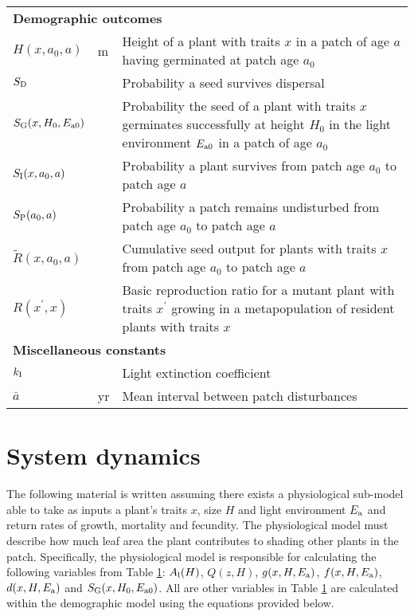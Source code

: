 \documentclass[10pt,twoside]{article}
\begin{document}
\begin{table}[ht]
\begin{tabular}{p{2cm}p{2cm}p{9cm}}
  \multicolumn{3}{l}{\textbf{Demographic outcomes}} \\
  $H(x, a_0, a)$   & m  & Height of a plant with traits $x$ in a patch of age $a$ having germinated at patch age $a_0$\\
  $S_{\rm D}$ &  & Probability a seed survives dispersal \\
  $S_{\rm G} (x, H_0, E_{{\rm a}0})$ &  & Probability the seed of a plant with traits $x$ germinates successfully at height $H_0$ in the light environment $E_{{\rm a}0}$ in a patch of age $a_0$\\
  $S_{\rm I} (x, a_0, a)$ &  & Probability a plant survives from patch age $a_0$ to patch age $a$\\
  $S_{\rm P} ( a_0, a)$ &  & Probability a patch remains undisturbed from patch age $a_0$ to patch age $a$\\
  $\tilde{R}(x, a_0, a)$ & & Cumulative seed output for plants with traits $x$ from patch age $a_0$ to patch age $a$ \\
  $R\left(x^\prime, x\right)$ & & Basic reproduction ratio for a mutant plant with traits $x^\prime$ growing in a metapopulation of resident plants with traits $x$\\

  \multicolumn{3}{l}{\textbf{Miscellaneous constants}} \\
  $k_{\rm I}$ &  & Light extinction coefficient\\
  $\bar{a}$ & yr & Mean interval between patch disturbances \\
  \hline
  \end{tabular}
\label{tab:definitions}
\end{table}

\clearpage

\section{System dynamics}\label{system-dynamics}

The following material is written assuming there exists a physiological sub-model
able to take as inputs a plant's traits $x$, size $H$ and light environment $E_{\rm a}$
and return rates of growth, mortality and fecundity. The physiological model must
describe how much leaf area the plant contributes to shading other plants in the patch.
Specifically, the physiological model is responsible for calculating the following
variables from Table \ref{tab:definitions}:
$A_{\rm l}(H)$, $Q(z, H)$, $g(x, H, E_{\rm a})$, $f(x, H, E_{\rm a})$, $d(x, H, E_{\rm a})$ and
$S_{\rm G} (x, H_0, E_{{\rm a}0})$.
All are other variables in Table \ref{tab:definitions} are calculated within the
demographic model using the equations provided below.
\end{document}
